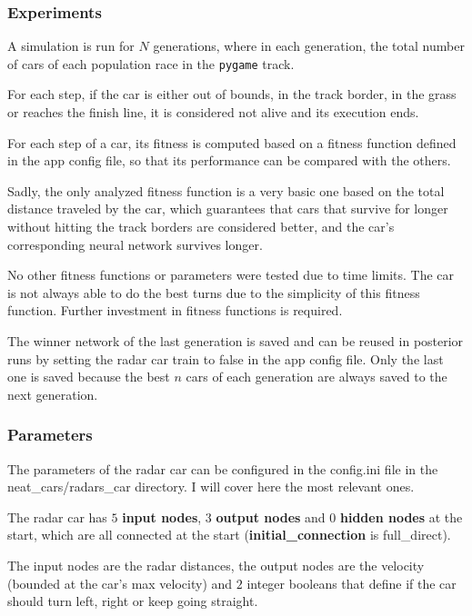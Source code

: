 \documentclass[a4paper]{article}
\begin{document}
\subsubsection{Experiments}
\label{subsubsec:radars-experiments}

A simulation is run for $N$ generations, where in each generation, the total number of cars of each population race in the \texttt{pygame} track.

For each step, if the car is either out of bounds, in the track border, in the grass or reaches the finish line, it is considered not alive and its execution ends.

For each step of a car, its fitness is computed based on a fitness function defined in the app config file, so that its performance can be compared with the others.

Sadly, the only analyzed fitness function is a very basic one based on the total distance traveled by the car, which guarantees that cars that survive for longer without hitting the track borders are considered better, and the car's corresponding neural network survives longer.

No other fitness functions or parameters were tested due to time limits. The car is not always able to do the best turns due to the simplicity of this fitness function. Further investment in fitness functions is required.

The winner network of the last generation is saved and can be reused in posterior runs by setting the radar car train to false in the app config file. Only the last one is saved because the best $n$ cars of each generation are always saved to the next generation.

\subsubsection{Parameters}
\label{subsubsec:radars-parameters}

The parameters of the radar car can be configured in the config.ini file in the neat\_cars/radars\_car directory. I will cover here the most relevant ones.

The radar car has $5$ \textbf{input nodes}, $3$ \textbf{output nodes} and $0$ \textbf{hidden nodes} at the start, which are all connected at the start (\textbf{initial\_connection} is full\_direct).

The input nodes are the radar distances, the output nodes are the velocity (bounded at the car's max velocity) and $2$ integer booleans that define if the car should turn left, right or keep going straight.
\end{document}

